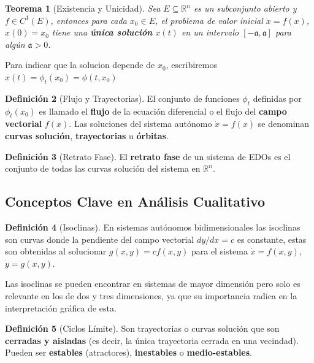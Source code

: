 \documentclass[12pt,letterpaper,oneside]{book}
\newtheorem{teorema}{Teorema}[chapter]
\theoremstyle{definition}
\newtheorem{definicion}[teorema]{Definición}
\theoremstyle{remark}
\begin{document}
	\begin{teorema}[Existencia y Unicidad]
		Sea $E \subseteq \mathbb{R}^n$ es un subconjunto abierto y $f \in C^1(E)$, entonces para cada $x_0 \in E$, el problema de valor inicial $\dot{x} = f(x)$, $x(0) = x_0$ tiene una \textbf{única solución} $x(t)$ en un intervalo $[-\mathfrak{a}, \mathfrak{a}]$ para algún $\mathfrak{a} > 0$.
	\end{teorema}
	
	Para indicar que la solucion depende de $x_0$, escribiremos $x(t)=\phi_t(x_0) = \phi(t, x_0)$ 
	
	\begin{definicion}[Flujo y Trayectorias]
		El conjunto de funciones $\phi_t$ definidas por $\phi_t(x_0)$ es llamado el \textbf{flujo} de la ecuación diferencial o el flujo del \textbf{campo vectorial} $f(x)$. Las soluciones del sistema autónomo $\dot{x} = f(x)$ se denominan \textbf{curvas solución}, \textbf{trayectorias} u \textbf{órbitas}.
	\end{definicion}
	
	\begin{definicion}[Retrato Fase]
		El \textbf{retrato fase} de un sistema de EDOs es el conjunto de todas las curvas solución del sistema en $\mathbb{R}^n$.
	\end{definicion}
	
	\subsection{Conceptos Clave en Análisis Cualitativo}
	
	\begin{definicion}[Isoclinas]
		En sistemas autónomos bidimensionales las isoclinas son curvas donde la pendiente del campo vectorial $dy/dx = c$ es constante, estas son obtenidas al solucionar $g(x, y) = cf(x, y)$ para el sistema $\dot{x} = f(x, y)$, $\dot{y} = g(x, y)$.
	\end{definicion}
	Las isoclinas se pueden encontrar en sistemas de mayor dimensión pero solo es relevante en los de dos y tres dimensiones, ya que su importancia radica en la interpretación gráfica de esta.
	\begin{definicion}[Ciclos Límite]
		Son trayectorias o curvas solución que son \textbf{cerradas y aisladas} (es decir, la única trayectoria cerrada en una vecindad). Pueden ser \textbf{estables} (atractores), \textbf{inestables} o \textbf{medio-estables}.
	\end{definicion}
	
\end{document}
